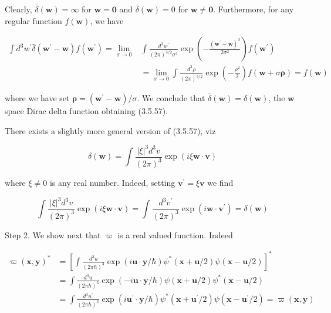 \documentclass{article}
\begin{document}
Clearly, $\bar{\delta}(\boldsymbol{w})=\infty$ for $\boldsymbol{w}=\mathbf{0}$ and $\bar{\delta}(\boldsymbol{w})=0$ for $\boldsymbol{w} \neq \mathbf{0}$. Furthermore, for any regular function $f(\boldsymbol{w})$, we have
 
\begin{align*}
\int d^{3} w^{\prime} \bar{\delta}\left(\boldsymbol{w}^{\prime}-\boldsymbol{w}\right) f\left(\boldsymbol{w}^{\prime}\right)=\lim _{\sigma \rightarrow 0} & \int \frac{d^{3} w^{\prime}}{(2 \pi)^{3 / 2} \sigma^{3}} \exp \left(-\frac{\left(\boldsymbol{w}^{\prime}-\boldsymbol{w}\right)^{2}}{2 \sigma^{2}}\right) f\left(\boldsymbol{w}^{\prime}\right)  \tag{3.5.63}\\
& =\lim _{\sigma \rightarrow 0} \int \frac{d^{3} \rho}{(2 \pi)^{3 / 2}} \exp \left(-\frac{\rho^{2}}{2}\right) f(\boldsymbol{w}+\sigma \boldsymbol{\rho})=f(\boldsymbol{w})
\end{align*}
 
where we have set $\boldsymbol{\rho}=\left(\boldsymbol{w}^{\prime}-\boldsymbol{w}\right) / \sigma$. We conclude that $\bar{\delta}(\boldsymbol{w})=\delta(\boldsymbol{w})$, the $\boldsymbol{w}$ space Dirac delta function obtaining (3.5.57).

There exists a slightly more general version of (3.5.57), viz
 
\begin{equation*}
\delta(\boldsymbol{w})=\int \frac{|\xi|^{3} d^{3} v}{(2 \pi)^{3}} \exp (i \xi \boldsymbol{w} \cdot \boldsymbol{v}) \tag{3.5.64}
\end{equation*}
 
where $\xi \neq 0$ is any real number. Indeed, setting $\boldsymbol{v}^{\prime}=\xi \boldsymbol{v}$ we find
 
\begin{equation*}
\int \frac{|\xi|^{3} d^{3} v}{(2 \pi)^{3}} \exp (i \xi \boldsymbol{w} \cdot \boldsymbol{v})=\int \frac{d^{3} v^{\prime}}{(2 \pi)^{3}} \exp \left(i \boldsymbol{w} \cdot \boldsymbol{v}^{\prime}\right)=\delta(\boldsymbol{w}) \tag{3.5.65}
\end{equation*}
 

Step 2. We show next that $\varpi$ is a real valued function. Indeed
 
\begin{align*}
\varpi(\boldsymbol{x}, \boldsymbol{y})^{*} & =\left[\int \frac{d^{3} u}{(2 \pi \hbar)^{3}} \exp (i \boldsymbol{u} \cdot \boldsymbol{y} / \hbar) \psi^{*}(\boldsymbol{x}+\boldsymbol{u} / 2) \psi(\boldsymbol{x}-\boldsymbol{u} / 2)\right]^{*}  \tag{3.5.66}\\
& =\int \frac{d^{3} u}{(2 \pi \hbar)^{3}} \exp (-i \boldsymbol{u} \cdot \boldsymbol{y} / \hbar) \psi(\boldsymbol{x}+\boldsymbol{u} / 2) \psi^{*}(\boldsymbol{x}-\boldsymbol{u} / 2) \\
& =\int \frac{d^{3} u^{\prime}}{(2 \pi \hbar)^{3}} \exp \left(i \boldsymbol{u}^{\prime} \cdot \boldsymbol{y} / \hbar\right) \psi^{*}\left(\boldsymbol{x}+\boldsymbol{u}^{\prime} / 2\right) \psi\left(\boldsymbol{x}-\boldsymbol{u}^{\prime} / 2\right)=\varpi(\boldsymbol{x}, \boldsymbol{y})
\end{align*}
 
\end{document}
